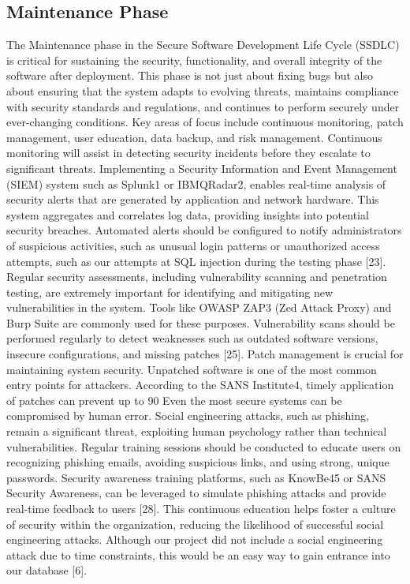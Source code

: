 \documentclass[letterpaper,twocolumn]{article}
\begin{document}
\subsection{Maintenance Phase}
The Maintenance phase in the Secure Software Development Life Cycle (SSDLC) is critical for sustaining the security, functionality, and overall integrity of the software after deployment. This phase is not just about fixing bugs but also about ensuring that the system adapts to evolving threats, maintains compliance with security standards and regulations, and continues to perform securely under ever-changing conditions. Key areas of focus include continuous monitoring, patch management, user education, data backup, and risk management. 
Continuous monitoring will assist in detecting security incidents before they escalate to significant threats. Implementing a Security Information and Event Management (SIEM) system such as Splunk1 or IBMQRadar2, enables real-time analysis of security alerts that are generated by application and network hardware. This system aggregates and correlates log data, providing insights into potential security breaches. Automated alerts should be configured to notify administrators of suspicious activities, such as unusual login patterns or unauthorized access attempts, such as our attempts at SQL injection during the testing phase [23]. 
Regular security assessments, including vulnerability scanning and penetration testing, are extremely important for identifying and mitigating new vulnerabilities in the system. Tools like OWASP ZAP3 (Zed Attack Proxy) and Burp Suite are commonly used for these purposes. Vulnerability scans should be performed regularly to detect weaknesses such as outdated software versions, insecure configurations, and missing patches [25].
Patch management is crucial for maintaining system security. Unpatched software is one of the most common entry points for attackers. According to the SANS Institute4, timely application of patches can prevent up to 90%
Even the most secure systems can be compromised by human error. Social engineering attacks, such as phishing, remain a significant threat, exploiting human psychology rather than technical vulnerabilities. Regular training sessions should be conducted to educate users on recognizing phishing emails, avoiding suspicious links, and using strong, unique passwords. Security awareness training platforms, such as KnowBe45 or SANS Security Awareness, can be leveraged to simulate phishing attacks and provide real-time feedback to users [28]. This continuous education helps foster a culture of security within the organization, reducing the likelihood of successful social engineering attacks. Although our project did not include a social engineering attack due to time constraints, this would be an easy way to gain entrance into our database [6].
\end{document}
